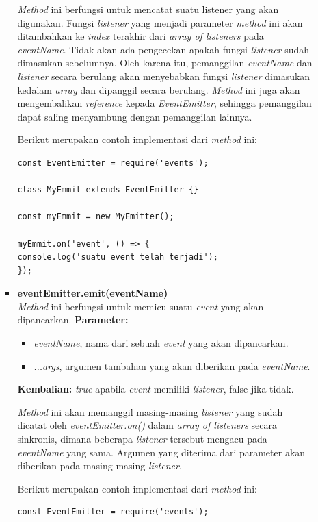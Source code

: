 \documentclass[a4paper,twoside]{article}
\begin{document}
\begin{enumerate}
\begin{enumerate}
\begin{itemize}
				\textit{Method} ini berfungsi untuk mencatat suatu listener yang akan digunakan. Fungsi \textit{listener} yang menjadi parameter \textit{method} ini akan ditambahkan ke \textit{index} terakhir dari \textit{array of listeners} pada \textit{eventName}. Tidak akan ada pengecekan apakah fungsi \textit{listener} sudah dimasukan sebelumnya. Oleh karena itu, pemanggilan \textit{eventName} dan \textit{listener} secara berulang akan menyebabkan fungsi \textit{listener} dimasukan kedalam \textit{array} dan dipanggil secara berulang. \textit{Method} ini juga akan mengembalikan \textit{reference} kepada \textit{EventEmitter}, sehingga pemanggilan dapat saling menyambung dengan pemanggilan lainnya.
				
				Berikut merupakan contoh implementasi dari \textit{method} ini:
\begin{lstlisting}
const EventEmitter = require('events');
				
class MyEmmit extends EventEmitter {}
				
const myEmmit = new MyEmitter();
				
myEmmit.on('event', () => {
console.log('suatu event telah terjadi');	
});
\end{lstlisting}
				
				\item \textbf{eventEmitter.emit(eventName)} \\ \textit{Method} ini berfungsi untuk memicu suatu \textit{event} yang akan dipancarkan. \textbf{Parameter:}
				\begin{itemize}
					\item \textit{eventName}, nama dari sebuah \textit{event} yang akan dipancarkan.
					\item \textit{...args}, argumen tambahan yang akan diberikan pada \textit{eventName}. 
				\end{itemize}
				\textbf{Kembalian:} \textit{true} apabila \textit{event} memiliki \textit{listener}, false jika tidak.
				
				\textit{Method} ini akan memanggil masing-masing \textit{listener} yang sudah dicatat oleh \textit{eventEmitter.on()} dalam \textit{array of listeners} secara sinkronis, dimana beberapa \textit{listener} tersebut mengacu pada \textit{eventName} yang sama. Argumen yang diterima dari parameter akan diberikan pada masing-masing \textit{listener}.
				
				Berikut merupakan contoh implementasi dari \textit{method} ini:
\begin{lstlisting}
const EventEmitter = require('events');
				

\end{lstlisting}
\end{itemize}
\end{enumerate}
\end{enumerate}
\end{document}
